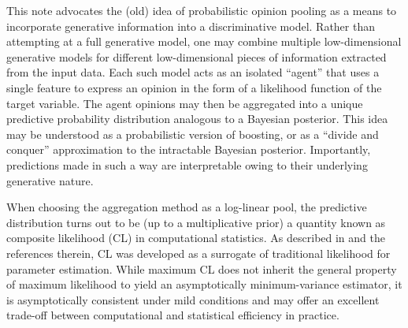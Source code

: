 \documentclass[english]{scrartcl}
\begin{document}
This note advocates the (old) idea of probabilistic opinion pooling \cite{Genest-86} as a means to incorporate generative information into a discriminative model. Rather than attempting at a full generative model, one may combine multiple low-dimensional generative models for different low-dimensional pieces of information extracted from the input data. Each such model acts as an isolated ``agent'' that uses a single feature to express an opinion in the form of a likelihood function of the target variable. The agent opinions may then be aggregated into a unique predictive probability distribution analogous to a Bayesian posterior. This idea may be understood as a probabilistic version of boosting, or as a ``divide and conquer'' approximation to the intractable Bayesian posterior. Importantly, predictions made in such a way are interpretable owing to their underlying generative nature. 


When choosing the aggregation method as a log-linear pool, the predictive distribution turns out to be (up to a multiplicative prior) a quantity known as composite likelihood (CL) in computational statistics. As described in \cite{Varin-11} and the references therein, CL was developed as a surrogate of traditional likelihood for parameter estimation. While maximum CL does not inherit the general property of maximum likelihood to yield an asymptotically minimum-variance estimator, it is asymptotically consistent under mild conditions \cite{Xu-11} and may offer an excellent trade-off between computational and statistical efficiency in practice.


\end{document}
